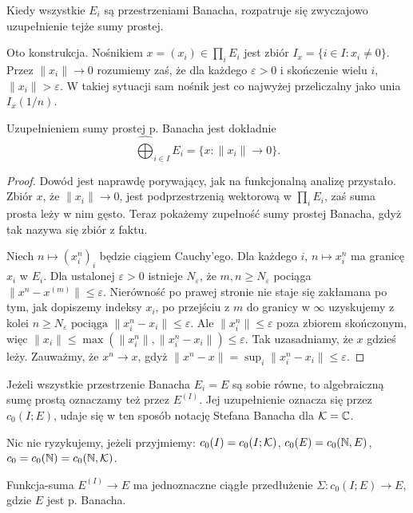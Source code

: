 Kiedy wszystkie $E_i$ są przestrzeniami Banacha, rozpatruje się zwyczajowo uzupełnienie tejże sumy prostej.

Oto konstrukcja.
Nośnikiem $x = (x_i) \in \prod_i E_i$ jest zbiór $I_x = \{i \in I : x_i \neq 0\}$.
Przez $\|x_i\| \to 0$ rozumiemy zaś, że dla każdego $\varepsilon > 0$ i skończenie wielu $i$, $\|x_i\| > \varepsilon$.
W takiej sytuacji sam nośnik jest co najwyżej przeliczalny jako unia $I_x(1/n)$.

\begin{fakt}
	Uzupełnieniem sumy prostej p. Banacha jest dokładnie
	\[
		\widehat{\bigoplus}_{i \in I} E_i = \{x : \|x_i\| \to 0\}.
	\]
\end{fakt}

\begin{proof}
Dowód jest naprawdę porywający, jak na funkcjonalną analizę przystało.
Zbiór $x$, że $\|x_i\| \to 0$, jest podprzestrzenią wektorową w $\prod_i E_i$, zaś suma prosta leży w nim gęsto.
Teraz pokażemy zupełność sumy prostej Banacha, gdyż tak nazywa się zbiór z faktu.

Niech $n \mapsto (x_i^{n})_i$ będzie ciągiem Cauchy'ego.
Dla każdego $i$, $n \mapsto x_i^{n}$ ma granicę $x_i$ w $E_i$.
Dla ustalonej $\varepsilon > 0$ istnieje $N_\varepsilon$, że
$m, n \ge N_\varepsilon$ pociąga $\|x^{n} - x^{(m)}\| \le \varepsilon$.
Nierówność po prawej stronie nie staje się zakłamana po tym, jak dopiszemy indeksy $x_i$, po przejściu z $m$ do granicy w $\infty$ uzyskujemy z kolei $n \ge N_\varepsilon \textrm{ pociąga } \|x_i^{n} - x_i\| \le \varepsilon$.
Ale $\|x_i^{n}\| \le \varepsilon$ poza zbiorem skończonym, więc $\|x_i\| \le \max (\|x_i^{n}\|, \|x_i^{n} - x_i\|) \le \varepsilon$.
Tak uzasadniamy, że $x$ gdzieś leży.
Zauważmy, że $x^{n} \to x$, gdyż $\|x^{n} -x\| = \sup_i \|x^n_i -x_i\| \le \varepsilon$.
\end{proof}

Jeżeli wszystkie przestrzenie Banacha $E_i = E$ są sobie równe, to algebraiczną sumę prostą oznaczamy też przez $E^{(I)}$.
Jej uzupełnienie oznacza się przez $c_0(I; E)$, udaje się w ten sposób notację Stefana Banacha dla $\mathcal K = \mathbb C$.

Nic nie ryzykujemy, jeżeli przyjmiemy: $c_0(I) = c_0(I; \mathcal K)$, $c_0(E) = c_0(\mathbb N, E)$, $c_0 = c_0(\mathbb N) = c_0(\mathbb N, \mathcal K)$.

\begin{wniosek}
	Funkcja-suma $E^{(I)} \to E$ ma jednoznaczne ciągłe przedłużenie $\Sigma \colon c_0(I; E) \to E$, gdzie $E$ jest p. Banacha.
\end{wniosek}

